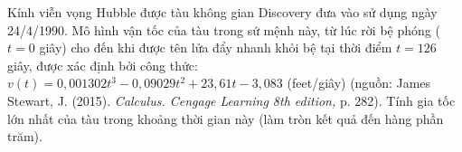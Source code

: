 \begin{bt}%
	Kính viễn vọng Hubble được tàu không gian Discovery đưa vào sử dụng ngày 24/4/1990. Mô hình vận tốc của tàu trong sứ mệnh này, từ lúc rời bệ phóng ($t=0$ giây) cho đến khi được tên lửa đẩy nhanh khỏi bệ tại thời điểm $t=126$ giây, được xác định bởi công thức:\\ $v(t)=0{,}001302t^3-0{,}09029t^2+23{,}61t-3{,}083$ (feet/giây) (nguồn: James Stewart, J. (2015). \textit{Calculus. Cengage Learning 8th edition,} p. 282). Tính gia tốc lớn nhất của tàu trong khoảng thời gian này (làm tròn kết quả đến hàng phần trăm).
\end{bt}

